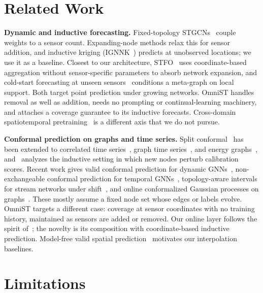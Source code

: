 \documentclass[journal,twoside,web]{ieeecolor}
\begin{document}
\section{Related Work}
\label{sec:related}

\textbf{Dynamic and inductive forecasting.} Fixed-topology STGCNs~\cite{yu2018stgcn} couple weights to
a sensor count. Expanding-node methods relax this for sensor addition, and inductive kriging
(IGNNK~\cite{ignnk2020}) predicts at unobserved locations; we use it as a baseline. Closest to our
architecture, STFO~\cite{stfo2026} uses coordinate-based aggregation without sensor-specific
parameters to absorb network expansion, and cold-start forecasting at unseen
sensors~\cite{coldstart_unseen2026} conditions a meta-graph on local support. Both target point
prediction under growing networks. OmniST handles removal as well as addition, needs no prompting or
continual-learning machinery, and attaches a coverage guarantee to its inductive forecasts.
Cross-domain spatiotemporal pretraining~\cite{dambast2026} is a different axis that we do not pursue.

\textbf{Conformal prediction on graphs and time series.} Split
conformal~\cite{vovk2005algorithmic,angelopoulos2023conformal} has been extended to correlated time
series~\cite{corel2025}, graph time series~\cite{conformalgraphts2026}, and energy
graphs~\cite{incontextresidual2026}, and~\cite{conformalinductivegnn2024} analyzes the inductive
setting in which new nodes perturb calibration scores. Recent work gives valid conformal prediction
for dynamic GNNs~\cite{validcpdyngnn2024}, non-exchangeable conformal prediction for temporal
GNNs~\cite{nonexchcptgnn2025}, topology-aware intervals for stream networks under
shift~\cite{staci2025}, and online conformalized Gaussian processes on graphs~\cite{conformalgp_online2025}.
These mostly assume a fixed node set whose edges or labels evolve. OmniST targets a different case:
coverage at sensor coordinates with no training history, maintained as sensors are added or removed.
Our online layer follows the spirit of~\cite{conformalgp_online2025,staci2025}; the novelty is its
composition with coordinate-based inductive prediction. Model-free valid spatial
prediction~\cite{validspatial2020} motivates our interpolation baselines.

\section{Limitations}
\label{sec:limitations}
\end{document}
